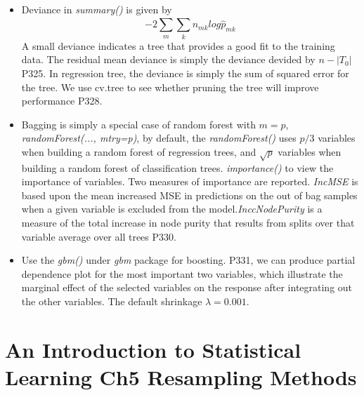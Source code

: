 \documentclass[a4paper, 12pt]{article}
\begin{document}
\begin{itemize}
	\item Deviance in \textit{summary()} is given by 
	\[ -2\sum_{m}^{}\sum_{k}n_{mk}log\hat{p}_{mk}
	\]
	A small deviance indicates a tree that provides a good fit to the training data. The residual mean deviance is simply the deviance devided by $n-|T_0|$ P325. In regression tree, the deviance is simply the sum of squared error for the tree. We use cv.tree to see whether pruning the tree will improve performance P328.
	\item Bagging is simply a special case of random forest with $m=p$, \textit{randomForest(..., mtry=p)}, by default, the \textit{randomForest()}  uses $p/3$ variables when building a random forest of regression trees, and $\sqrt{p}$ variables when building a random forest of classification trees. \textit{importance()} to view the importance of variables. Two measures of importance are reported. \textit{IncMSE} is based upon the mean increased MSE in predictions on the out of bag samples when a given variable is excluded from the model.\textit{InccNodePurity} is a measure of the total increase in node purity that results from splits over that variable average over all trees P330.
	\item Use the \textit{gbm()} under \textit{gbm} package for boosting. P331, we can produce partial dependence plot for the most important two variables, which illustrate the marginal effect of the selected variables on the response after integrating out the other variables. The default shrinkage $\lambda=0.001$.
	
\end{itemize}
	
\section*{An Introduction to Statistical Learning Ch5 Resampling Methods}
\end{document}
